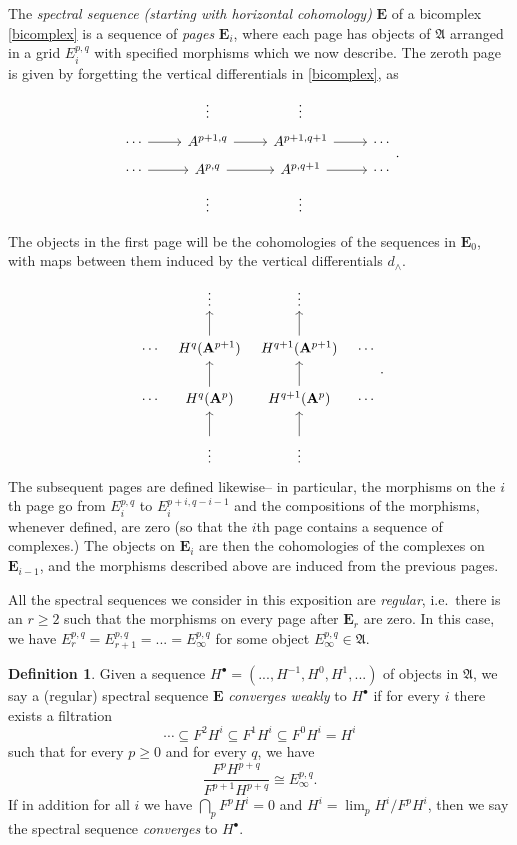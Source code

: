 \documentclass[a4paper]{article}
\theoremstyle{definition}
\newtheorem{defn}{Definition}[section]
\theoremstyle{remark}
\begin{document}
The \textit{spectral sequence (starting with horizontal cohomology)}
\(\mathbf{E}\) of a bicomplex \eqref{bicomplex} is a sequence of \textit{pages}
\(\mathbf{E}_i\), where each page has objects of \(\mathfrak{A}\) arranged in a
grid \(E^{p,q}_i\) with specified morphisms which we now describe. The zeroth
page is given by forgetting the vertical differentials in \eqref{bicomplex}, as
\[\begin{tikzcd}[row sep=tiny]
    & \vdots & \vdots & \\
    \cdots \arrow[r] & A^{p+1,q} \arrow[r] & A^{p+1,q+1} \arrow[r] &\cdots \\
    \cdots \arrow[r] & A^{p,q} \arrow[r] & A^{p,q+1} \arrow[r] &\cdots  \\
    & \vdots & \vdots & \\
\end{tikzcd}.\]
The objects in the first page will be the cohomologies of the sequences in
\(\mathbf{E}_0\), with maps between them induced by the vertical differentials
\(d_\wedge\).
\[\begin{tikzcd}[column sep = tiny] 
    &\vdots &\vdots & \\
    \cdots & H^q(\mathbf{A}^{p+1}) \arrow[u] &   H^{q+1}(\mathbf{A}^{p+1}) \arrow[u]
           & \cdots \\
    \cdots & H^q(\mathbf{A}^{p}) \arrow[u] &   H^{q+1}(\mathbf{A}^{p}) \arrow[u]
           & \cdots \\
           &\vdots\arrow[u] &\vdots\arrow[u] & 
\end{tikzcd}.\]
The subsequent pages are defined likewise-- in particular, the morphisms on the
\(i\)th page go from \(E_i^{p,q}\) to \(E_i^{p+i,q-i-1}\) and the compositions
of the morphisms, whenever defined, are zero (so that the \(i\)th page contains a
sequence of complexes.) The objects on \(\mathbf{E}_i\) are then the
cohomologies of the complexes on \(\mathbf{E}_{i-1}\), and the morphisms described
above are induced from the previous pages. 

All the spectral sequences we consider in this exposition are \textit{regular},
i.e.\ there is an \(r\geq 2\) such that the morphisms on every page after
\(\mathbf{E}_r\) are zero. In this case, we have \(E^{p,q}_r = E^{p,q}_{r+1} =
... = E^{p,q}_\infty\) for some object \(E^{p,q}_\infty \in \mathfrak{A}\).

\begin{defn}
    Given a sequence \(H^\bullet=(..., H^{-1},H^0,H^1,...)\) of objects in
    \(\mathfrak{A}\), we say a (regular) spectral sequence \(\mathbf{E}\)
    \textit{converges weakly} to \(H^\bullet\) if for every \(i\) there exists a
    filtration 
    \[\cdots \subseteq F^2H^i \subseteq F^{1}H^i \subseteq F^0H^i =
    H^i \] such that for every \(p\geq 0\) and for every \(q\), we have 
    \[\frac{F^pH^{p+q}}{F^{p+1}H^{p+q}} \cong E^{p,q}_\infty.\]
    If in addition for all \(i\) we have \(\bigcap_pF^pH^i= 0\) and \(H^i =
    \lim_p H^i/F^pH^i\), then we say the spectral sequence \textit{converges} to
    \(H^\bullet\).
\end{defn}
\end{document}
